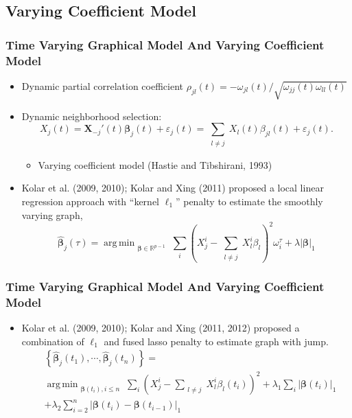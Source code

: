\documentclass{beamer}
\newcommand{\R}{\mathbb R}
\newcommand{\bX}{\mathbf X}
\newcommand{\bbeta}{{\boldsymbol{\beta}}}
\DeclareMathOperator*{\argmin}{arg\,min}
\begin{document}
\subsection{Varying Coefficient Model}
\begin{frame}

\frametitle{Time Varying Graphical Model And Varying Coefficient Model}

\begin{itemize}
    \item Dynamic partial correlation coefficient $\rho_{jl}(t) = - \omega_{jl}(t) / \sqrt{\omega_{jj}(t) \omega_{ll}(t)} $
    \item Dynamic neighborhood selection:
    \begin{equation}
    \label{eq:varycoefmodel}
    X_j(t) = \bX_{-j}'(t) \bbeta_j(t) + \varepsilon_j(t) = \sum_{\substack{l\neq j}} X_l(t) \beta_{jl}(t) + \varepsilon_j(t).
    \end{equation}
    \begin{itemize}
    	\item Varying coefficient model (Hastie and Tibshirani, 1993)
    \end{itemize}
    \item Kolar et al. (2009, 2010); Kolar and Xing (2011) proposed a local linear regression approach with “kernel $\ell_1$” penalty to estimate the smoothly varying graph,
    \begin{equation}
    \label{eq:smoothgraph}
    \hat{\bbeta}_j(\tau) = \argmin_{\substack{\bbeta \in \R^{p-1}}} \sum_i(X_j^i - \sum_{\substack{l\neq j}} X_l^i \beta_l)^2 \omega_i^{\tau} + \lambda|\bbeta|_1
    \end{equation}
\end{itemize}

\end{frame}


\begin{frame}
\frametitle{Time Varying Graphical Model And Varying Coefficient Model}
\begin{itemize}
	\item Kolar et al. (2009, 2010); Kolar and Xing (2011, 2012) proposed a combination of $\ell_1$ and fused lasso penalty to estimate graph with jump.
	\begin{equation}
	\label{eq:jumpgraph}
	\begin{aligned}
	&\left\{ \hat{\bbeta}_j(t_1), \cdots, \hat{\bbeta}_j(t_n) \right\} =\\ &\argmin_{\substack{\bbeta(t_i), i \leq n}} \sum_i(X_j^i - \sum_{\substack{l\neq j}} X_l^i \beta_l(t_i))^2  + \lambda_1 \sum_{i}|\bbeta(t_i)|_1 \\
	&+ \lambda_2 \sum_{i = 2}^n|\bbeta(t_i) - \bbeta(t_{i-1})|_1
	\end{aligned}	
	\end{equation}
\end{itemize}

\end{frame}
\end{document}
